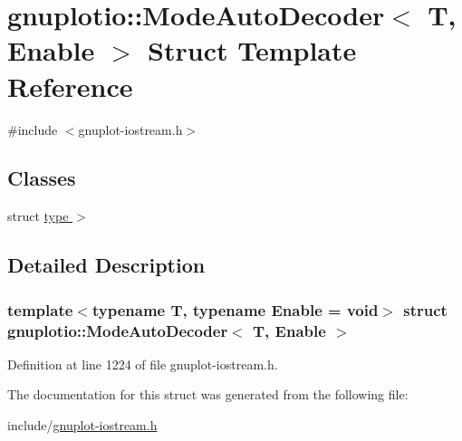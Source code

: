 \hypertarget{structgnuplotio_1_1_mode_auto_decoder}{}\section{gnuplotio\+:\+:Mode\+Auto\+Decoder$<$ T, Enable $>$ Struct Template Reference}
\label{structgnuplotio_1_1_mode_auto_decoder}


{\ttfamily \#include $<$gnuplot-\/iostream.\+h$>$}

\subsection*{Classes}
\begin{DoxyCompactItemize}
\item 
struct \hyperlink{structgnuplotio_1_1_mode_auto_decoder_1_1type_01_4}{type $>$}
\end{DoxyCompactItemize}


\subsection{Detailed Description}
\subsubsection*{template$<$typename T, typename Enable = void$>$\newline
struct gnuplotio\+::\+Mode\+Auto\+Decoder$<$ T, Enable $>$}



Definition at line 1224 of file gnuplot-\/iostream.\+h.



The documentation for this struct was generated from the following file\+:\begin{DoxyCompactItemize}
\item 
include/\hyperlink{gnuplot-iostream_8h}{gnuplot-\/iostream.\+h}\end{DoxyCompactItemize}
